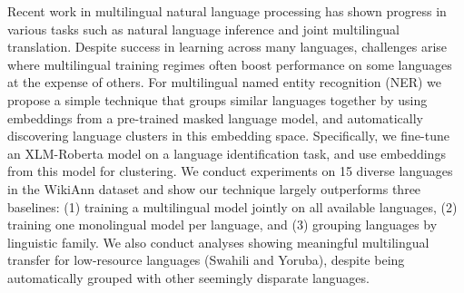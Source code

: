 Recent work in multilingual natural language processing has shown progress in various tasks such as natural language inference and joint multilingual translation. Despite success in learning across many languages, challenges arise where multilingual training regimes often boost performance on some languages at the expense of others. For multilingual named entity recognition (NER) we propose a simple technique that groups similar languages together by using embeddings from a pre-trained masked language model, and automatically discovering language clusters in this embedding space. Specifically, we fine-tune an XLM-Roberta model on a language identification task, and use embeddings from this model for clustering. We conduct experiments on 15 diverse languages in the WikiAnn dataset and show our technique largely outperforms three baselines: (1) training a multilingual model jointly on all available languages, (2) training one monolingual model per language, and (3) grouping languages by linguistic family. We also conduct analyses showing meaningful multilingual transfer for low-resource languages (Swahili and Yoruba), despite being automatically grouped with other seemingly disparate languages.
